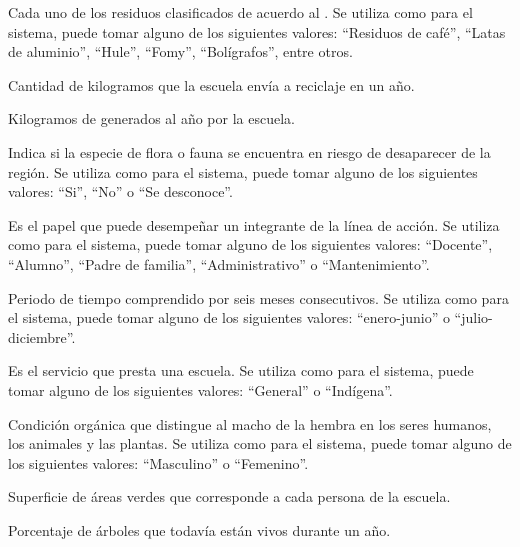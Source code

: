 \begin{description}
     Cada uno de los residuos clasificados de acuerdo al . Se utiliza como  para el sistema, puede tomar alguno de los siguientes valores: ``Residuos de café'', ``Latas de aluminio'', ``Hule'', ``Fomy'', ``Bolígrafos'', entre otros.
    
     Cantidad de kilogramos que la escuela envía a reciclaje en un año.
    
     Kilogramos de  generados al año por la escuela.

     Indica si la especie de flora o fauna se encuentra en riesgo de desaparecer de la región. Se utiliza como  para el sistema, puede tomar alguno de los siguientes valores: ``Si'', ``No'' o ``Se desconoce''.
	
     Es el papel que puede desempeñar un integrante de la línea de acción. Se utiliza como  para el sistema, puede tomar alguno de los siguientes valores: 
    ``Docente'', ``Alumno'', ``Padre de familia'', ``Administrativo'' o ``Mantenimiento''.

     Periodo de tiempo comprendido por seis meses consecutivos. Se utiliza como  para el sistema, puede tomar alguno de los siguientes valores: ``enero-junio'' o ``julio-diciembre''.

     Es el servicio que presta una escuela. Se utiliza como  para el sistema, puede tomar alguno de los siguientes valores: ``General'' o ``Indígena''.
    
     Condición orgánica que distingue al macho de la hembra en los seres humanos, los animales y las plantas. Se utiliza como  para el sistema, puede tomar alguno de los siguientes valores: 
    ``Masculino'' o ``Femenino''.
    
     Superficie de áreas verdes que corresponde a cada persona de la escuela.
    
     Porcentaje de árboles que todavía están vivos durante un año.
    

\end{description}
